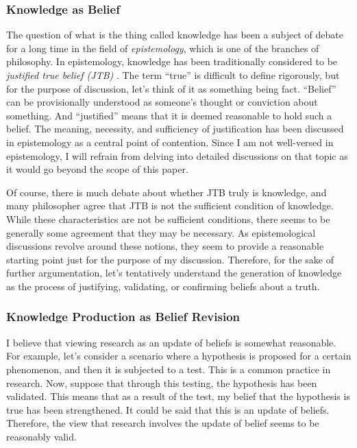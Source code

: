 \subsubsection{Knowledge as Belief}
The question of what is the thing called knowledge has been a subject of debate for a long time in the field of \textit{epistemology}, which is one of the branches of philosophy. In epistemology, knowledge has been traditionally considered to be \textit{justified true belief (JTB)} \cite{sep-epistemology}. The term ``true'' is difficult to define rigorously, but for the purpose of discussion, let's think of it as something being fact. ``Belief'' can be provisionally understood as someone's thought or conviction about something. And ``justified'' means that it is deemed reasonable to hold such a belief. The meaning, necessity, and sufficiency of justification has been discussed in epistemology as a central point of contention. Since I am not well-versed in epistemology, I will refrain from delving into detailed discussions on that topic as it would go beyond the scope of this paper.

Of course, there is much debate about whether JTB truly is knowledge, and many philosopher agree that JTB is not the sufficient condition of knowledge. While these characteristics are not be sufficient conditions, there seems to be generally some agreement that they may be necessary. As epistemological discussions revolve around these notions, they seem to provide a reasonable starting point just for the purpose of my discussion. Therefore, for the sake of further argumentation, let's tentatively understand the generation of knowledge as the process of justifying, validating, or confirming beliefs about a truth.

\subsubsection{Knowledge Production as Belief Revision}
I believe that viewing research as an update of beliefs is somewhat reasonable. For example, let's consider a scenario where a hypothesis is proposed for a certain phenomenon, and then it is subjected to a test. This is a common practice in research. Now, suppose that through this testing, the hypothesis has been validated. This means that as a result of the test, my belief that the hypothesis is true has been strengthened. It could be said that this is an update of beliefs. Therefore, the view that research involves the update of belief seems to be reasonably valid.

